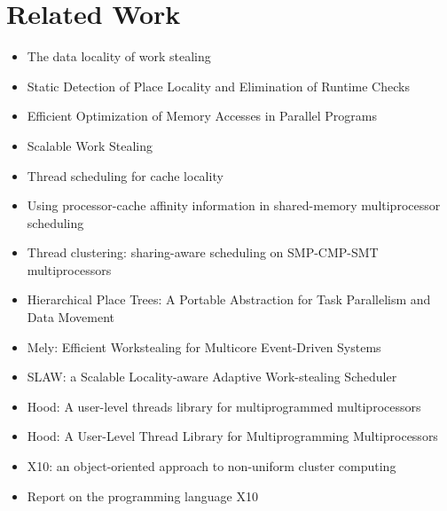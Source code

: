 
\chapter{Related Work}
\label{chap:locality-related-work}

\begin{itemize}
\item[\textbullet] The data locality of work stealing \cite{Acar2002}
\item[\textbullet] Static Detection of Place Locality and Elimination
  of Runtime Checks \cite{Agarwal2008}
\item[\textbullet] Efficient Optimization of Memory Accesses in
  Parallel Programs \cite{Barik2009}
\item[\textbullet] Scalable Work Stealing \cite{Dinan2009}
\item[\textbullet] Thread scheduling for cache locality \cite{Philbin1996}
\item[\textbullet] Using processor-cache affinity information in
  shared-memory multiprocessor scheduling \cite{Squillante1993}
\item[\textbullet] Thread clustering: sharing-aware scheduling on
  SMP-CMP-SMT multiprocessors \cite{Tam2007}
\item[\textbullet] Hierarchical Place Trees: A Portable Abstraction
  for Task Parallelism and Data Movement \cite{Yan2009}
\item[\textbullet] Mely: Efficient Workstealing for Multicore
  Event-Driven Systems \cite{Gaud2010}
\item[\textbullet] SLAW: a Scalable Locality-aware Adaptive
  Work-stealing Scheduler \cite{Guo2010}
\item[\textbullet] Hood: A user-level threads library for
  multiprogrammed multiprocessors \cite{Blumofe1998}
\item[\textbullet] Hood: A User-Level Thread Library for
  Multiprogramming Multiprocessors \cite{Papadopoulos1998}
\item[\textbullet] X10: an object-oriented approach to non-uniform
  cluster computing \cite{Charles2005}
\item[\textbullet] Report on the programming language X10
  \cite{Saraswat2010}
\end{itemize}


